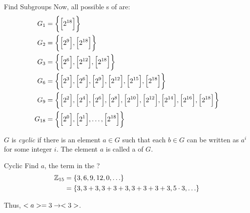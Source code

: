 \begin{example}{Find Subgroups}
  Now, all possible s of  are:
  \begin{align*}
    G_{1} &= \biggl \lbrace \Bigl[ 2^{18} \Bigr] \biggr \rbrace \\
    G_{2} &= \biggl \lbrace \Bigl[ 2^{9} \Bigr], \Bigl[ 2^{18}\Bigr] \biggr \rbrace \\
    G_{3} &= \biggl \lbrace \Bigl[ 2^{6} \Bigr], \Bigl[ 2^{12} \Bigr], \Bigl[ 2^{18} \Bigr] \biggr \rbrace \\
    G_{6} &= \biggl \lbrace \Bigl[ 2^{3} \Bigr], \Bigl[ 2^{6} \Bigr], \Bigl[ 2^{9} \Bigr], \Bigl[ 2^{12} \Bigr], \Bigl[ 2^{15} \Bigr], \Bigl[ 2^{18} \Bigr] \biggr \rbrace \\
    G_{9} &= \biggl \lbrace \Bigl[ 2^{2} \Bigr], \Bigl[ 2^{4} \Bigr], \Bigl[ 2^{6} \Bigr], \Bigl[ 2^{8} \Bigr], \Bigl[ 2^{10} \Bigr], \Bigl[ 2^{12} \Bigr], \Bigl[ 2^{14} \Bigr], \Bigl[ 2^{16} \Bigr], \Bigl[ 2^{18} \Bigr] \biggr \rbrace \\
    G_{18} &= \biggl \lbrace \Bigl[ 2^{0} \Bigr], \Bigl[ 2^{1} \Bigr], \ldots, \Bigl[ 2^{18} \Bigr] \biggr \rbrace \\
  \end{align*}
\end{example}

\begin{definition}[Cyclic]\label{def:Cyclic}
  $G$ is \emph{cyclic} if there is an element $a \in G$ such that each $b \in G$ can be written as $a^{i}$ for some integer $i$.
  The element $a$ is called a \emph{} of $G$.
\end{definition}

\begin{example}[]{Cyclic}
  Find $a$, the  term in the  ?
  \tcblower{}
  \begin{equation*}
    \begin{aligned}
      \operatorname{\mathbb{Z}}_{15} &= \lbrace 3, 6, 9, 12, 0, \ldots \rbrace \\
      &= \lbrace 3, 3+3, 3+3+3, 3+3+3+3, 5 \cdot 3, \ldots \rbrace \\
    \end{aligned}
  \end{equation*}

  Thus, $<a> = 3 \rightarrow <3>$.
\end{example}

